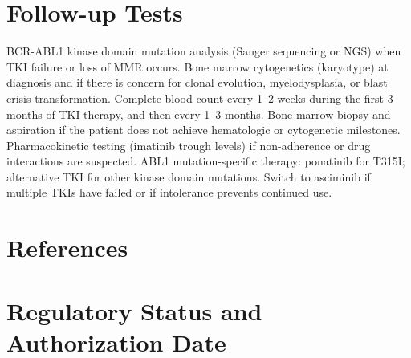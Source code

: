 \section*{Follow-up Tests}
BCR-ABL1 kinase domain mutation analysis (Sanger sequencing or NGS) when TKI failure or loss of MMR occurs. Bone marrow cytogenetics (karyotype) at diagnosis and if there is concern for clonal evolution, myelodysplasia, or blast crisis transformation. Complete blood count every 1--2 weeks during the first 3 months of TKI therapy, and then every 1--3 months. Bone marrow biopsy and aspiration if the patient does not achieve hematologic or cytogenetic milestones. Pharmacokinetic testing (imatinib trough levels) if non-adherence or drug interactions are suspected. ABL1 mutation-specific therapy: ponatinib for T315I; alternative TKI for other kinase domain mutations. Switch to asciminib if multiple TKIs have failed or if intolerance prevents continued use.

\section*{References}



\clearpage
\section*{Regulatory Status and Authorization Date}

\clearpage
